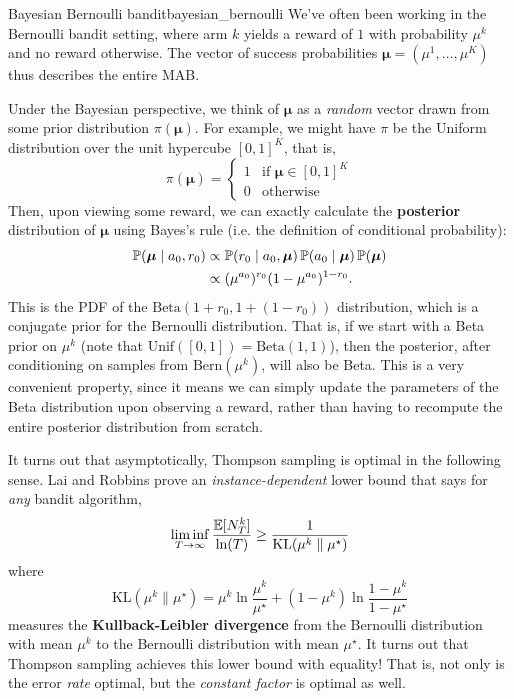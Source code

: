 \documentclass[\main/main]{subfiles}
\newcommand{\muv}{\boldsymbol{\mu}}
\begin{document}
\begin{example}{Bayesian Bernoulli bandit}{bayesian_bernoulli}
    We've often been working in the Bernoulli bandit setting, where arm $k$ yields a reward of $1$ with probability $\mu^k$ and no reward otherwise. The vector of success probabilities $\muv = (\mu^1, \dots, \mu^K)$ thus describes the entire MAB.

    Under the Bayesian perspective, we think of $\muv$ as a \emph{random} vector drawn from some prior distribution $\pi(\muv)$. For example, we might have $\pi$ be the Uniform distribution over the unit hypercube $[0, 1]^K$, that is, \[
        \pi(\muv) = \begin{cases}
            1 & \text{if } \muv \in [0, 1]^K \\
            0 & \text{otherwise}
        \end{cases}
    \]
    Then, upon viewing some reward, we can exactly calculate the \textbf{posterior} distribution of $\muv$ using Bayes's rule (i.e. the definition of conditional probability):
    \begin{align*}
        \P(\muv \mid a_0, r_0) & \propto \P(r_0 \mid a_0, \muv) \P(a_0 \mid \muv) \P(\muv) \\
                               & \propto (\mu^{a_0})^{r_0} (1 - \mu^{a_0})^{1-r_0}.
    \end{align*}
    This is the PDF of the $\text{Beta}(1 + r_0, 1 + (1 - r_0))$ distribution, which is a conjugate prior for the Bernoulli distribution. That is, if we start with a Beta prior on $\mu^k$ (note that $\text{Unif}([0, 1]) = \text{Beta}(1, 1)$), then the posterior, after conditioning on samples from $\text{Bern}(\mu^k)$, will also be Beta. This is a very convenient property, since it means we can simply update the parameters of the Beta distribution upon observing a reward, rather than having to recompute the entire posterior distribution from scratch.
\end{example}


It turns out that asymptotically, Thompson sampling is optimal in the following sense. Lai and Robbins \cite{lai_asymptotically_1985} prove an \emph{instance-dependent} lower bound that says for \emph{any} bandit algorithm,
\[
    \liminf_{T \to \infty} \frac{\operatorname*{\mathbb{E}}[N_T^k]}{\ln(T)} \ge \frac{1}{\text{KL}(\mu^k \parallel \mu^\star)}
\]
where \[
    \text{KL}(\mu^k \parallel \mu^\star) = \mu^k \ln \frac{\mu^k}{\mu^\star} + (1 - \mu^k) \ln \frac{1 - \mu^k}{1 - \mu^\star}
\] measures the \textbf{Kullback-Leibler divergence} from the Bernoulli distribution with mean $\mu^k$ to the Bernoulli distribution with mean $\mu^\star$.
It turns out that Thompson sampling achieves this lower bound with equality! That is, not only is the error \emph{rate} optimal, but the \emph{constant factor} is optimal as well.
\end{document}
